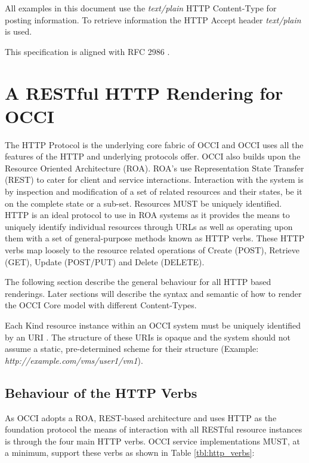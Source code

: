 \documentclass[10pt,a4paper]{article}
\begin{document}
All examples in this document use the \emph{text/plain} HTTP
Content-Type for posting information. To retrieve information the HTTP
Accept header \emph{text/plain} is used.

This specification is aligned with RFC 2986 \cite{rfc3986}.

\section{A RESTful HTTP Rendering for OCCI}
The HTTP Protocol is the underlying core fabric of OCCI and OCCI uses
all the features of the HTTP and underlying protocols offer.  OCCI
also builds upon the Resource Oriented Architecture (ROA).  ROA's use
Representation State Transfer (REST) \cite{REST_Fielding} to cater for
client and service interactions. Interaction with the system is by
inspection and modification of a set of related resources and their
states, be it on the complete state or a sub-set. Resources MUST be
uniquely identified. HTTP is an ideal protocol to use in ROA systems
as it provides the means to uniquely identify individual resources
through URLs as well as operating upon them with a set of
general-purpose methods known as HTTP verbs. These HTTP verbs map
loosely to the resource related operations of Create (POST), Retrieve
(GET), Update (POST/PUT) and Delete (DELETE).

The following section describe the general behaviour for all HTTP
based renderings. Later sections will describe the syntax and semantic
of how to render the OCCI Core model with different Content-Types.

Each Kind resource instance within an OCCI system must be uniquely
identified by an URI \cite{occi:core}. The structure of these URIs is
opaque and the system should not assume a static, pre-determined
scheme for their structure (Example:
\emph{http://example.com/vms/user1/vm1}).

\subsection{Behaviour of the HTTP Verbs}
As OCCI adopts a ROA, REST-based architecture and uses HTTP as the
foundation protocol the means of interaction with all RESTful resource
instances is through the four main HTTP verbs. OCCI service
implementations MUST, at a minimum, support these verbs as shown in
Table \ref{tbl:http_verbs}:
\end{document}
